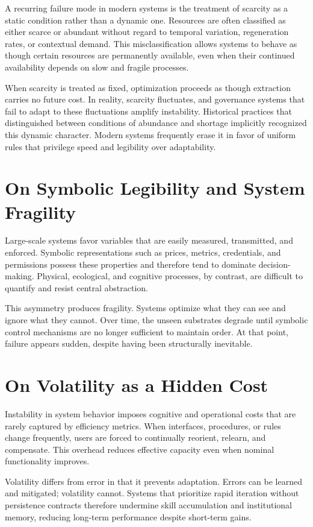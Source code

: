 \documentclass[12pt]{article} \usepackage[margin=1in]{geometry} \usepackage{setspace} \usepackage{amsmath,amssymb} \usepackage{hyperref}
\begin{document}
A recurring failure mode in modern systems is the treatment of scarcity as a static condition rather than a dynamic one. Resources are often classified as either scarce or abundant without regard to temporal variation, regeneration rates, or contextual demand. This misclassification allows systems to behave as though certain resources are permanently available, even when their continued availability depends on slow and fragile processes.

When scarcity is treated as fixed, optimization proceeds as though extraction carries no future cost. In reality, scarcity fluctuates, and governance systems that fail to adapt to these fluctuations amplify instability. Historical practices that distinguished between conditions of abundance and shortage implicitly recognized this dynamic character. Modern systems frequently erase it in favor of uniform rules that privilege speed and legibility over adaptability.

\section{On Symbolic Legibility and System Fragility}

Large-scale systems favor variables that are easily measured, transmitted, and enforced. Symbolic representations such as prices, metrics, credentials, and permissions possess these properties and therefore tend to dominate decision-making. Physical, ecological, and cognitive processes, by contrast, are difficult to quantify and resist central abstraction.

This asymmetry produces fragility. Systems optimize what they can see and ignore what they cannot. Over time, the unseen substrates degrade until symbolic control mechanisms are no longer sufficient to maintain order. At that point, failure appears sudden, despite having been structurally inevitable.

\section{On Volatility as a Hidden Cost}

Instability in system behavior imposes cognitive and operational costs that are rarely captured by efficiency metrics. When interfaces, procedures, or rules change frequently, users are forced to continually reorient, relearn, and compensate. This overhead reduces effective capacity even when nominal functionality improves.

Volatility differs from error in that it prevents adaptation. Errors can be learned and mitigated; volatility cannot. Systems that prioritize rapid iteration without persistence contracts therefore undermine skill accumulation and institutional memory, reducing long-term performance despite short-term gains.
\end{document}
